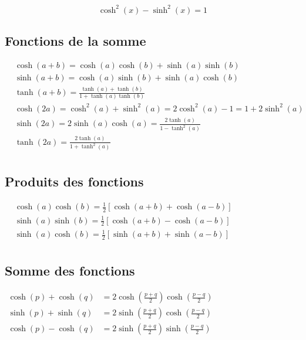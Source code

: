 $$\cosh^{2}(x)-\sinh^{2}(x)=1$$

\subsection{Fonctions de la somme}

$
\begin{aligned} 
   & \cosh(a+b)=\cosh(a) \cosh(b)+\sinh(a) \sinh(b)\\ 
   & \sinh(a+b)=\cosh(a) \sinh(b)+\sinh(a) \cosh(b) \\ 
   & \tanh(a+b)=\frac{\tanh(a)+\tanh(b)}{1+\tanh(a) \tanh(b)} \\
   & \cosh(2 a)=\cosh^{2}(a)+\sinh^{2}(a)=2 \cosh^{2}(a)-1=1+2 \sinh^{2}(a)\\
   & \sinh(2 a)=2 \sinh(a) \cosh(a) = \frac{2 \tanh(a)}{1-\tanh^{2}(a)} \\
   & \tanh(2 a)=\frac{2 \tanh(a)}{1+\tanh^{2}(a)} \\
\end{aligned}
$

\subsection{Produits des fonctions}

$
\begin{aligned} 
& \cosh (a) \cosh (b)= \frac{1}{2} \left[ \cosh (a+b) + \cosh (a-b) \right]\\ 
& \sinh (a) \sinh (b)= \frac{1}{2}\left[ \cosh (a+b) - \cosh (a-b) \right] \\ 
&  \sinh (a) \cosh (b)= \frac{1}{2}\left[ \sinh (a+b) + \sinh (a-b) \right] \\
\end{aligned}
$



\subsection{Somme des fonctions}

$
\begin{aligned}
\cosh (p)+\cosh (q) & =2 \cosh \left(\frac{p+q}{2}\right) \cosh \left(\frac{p-q}{2}\right) \\
\sinh (p)+\sinh (q) & =2 \sinh \left(\frac{p+q}{2}\right) \cosh \left(\frac{p-q}{2}\right) \\
\cosh (p)-\cosh (q) & =2 \sinh \left(\frac{p+q}{2}\right) \sinh \left(\frac{p-q}{2}\right)
\end{aligned}
$

